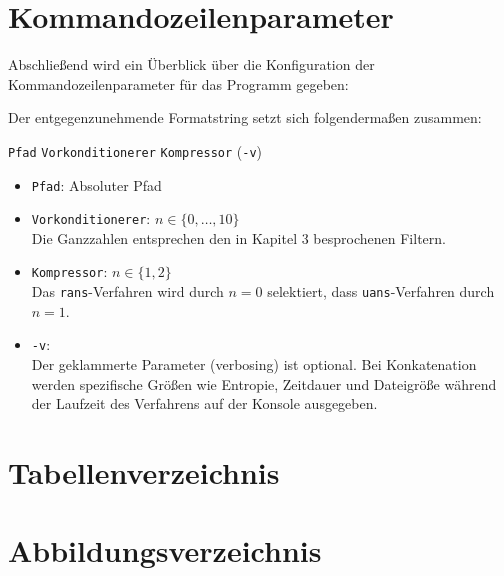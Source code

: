 \documentclass[a4paper,12pt]{article}
\begin{document}
\section{Kommandozeilenparameter}\label{Kommandozeilenparameter}
Abschließend wird ein Überblick über die Konfiguration der Kommandozeilenparameter für das Programm gegeben:
\par
Der entgegenzunehmende Formatstring setzt sich folgendermaßen zusammen:
\begin{center}
{\tt{Pfad}} {\tt{Vorkonditionerer}} {\tt{Kompressor}} ({\tt{-v}}) 
\end{center}
\begin{itemize}
	\item {\tt{Pfad}}: Absoluter Pfad 
	\item {\tt{Vorkonditionerer}}: $n\in \{0,\ldots, 10\}$
	\\
	Die Ganzzahlen entsprechen den in Kapitel 3 besprochenen Filtern.
	\item {\tt{Kompressor}}: $n\in\{1,2\}$
	\\
	Das {\tt{rans}}-Verfahren wird durch $n=0$ selektiert, dass {\tt{uans}}-Verfahren durch $n=1$.
	\item {\tt{-v}}:
	\\
Der geklammerte Parameter (verbosing) ist optional. Bei Konkatenation werden spezifische Größen wie Entropie, Zeitdauer und Dateigröße während der Laufzeit des Verfahrens auf der Konsole ausgegeben.
\end{itemize} 
\newpage
\section{Tabellenverzeichnis}
\listoftables 
\newpage
\section{Abbildungsverzeichnis}
\listoffigures
\newpage
\end{document}
